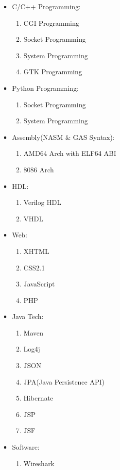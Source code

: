 \documentclass{res}
\begin{document}
\begin{resume}
	\begin{itemize}
		\item C/C++ Programming:
			\begin{enumerate}
				\item CGI Programming
				\item Socket Programming
				\item System Programming
				\item GTK Programming
			\end{enumerate}
		\item Python Programming:
			\begin{enumerate}
				\item Socket Programming
				\item System Programming
			\end{enumerate}
		\item Assembly(NASM \& GAS Syntax):
			\begin{enumerate}
				\item AMD64 Arch with ELF64 ABI
				\item 8086 Arch
			\end{enumerate}
		\item HDL:
			\begin{enumerate}
				\item Verilog HDL
				\item VHDL
			\end{enumerate}
		\item Web:
			\begin{enumerate}
				\item XHTML
				\item CSS2.1
				\item JavaScript
				\item PHP
			\end{enumerate}
		\item Java Tech:
			\begin{enumerate}
				\item Maven
				\item Log4j
				\item JSON
				\item JPA(Java Persistence API)
				\item Hibernate
				\item JSP
				\item JSF
			\end{enumerate}
		\item Software:
			\begin{enumerate}
				\item Wireshark

\end{enumerate}
\end{itemize}
\end{resume}
\end{document}
